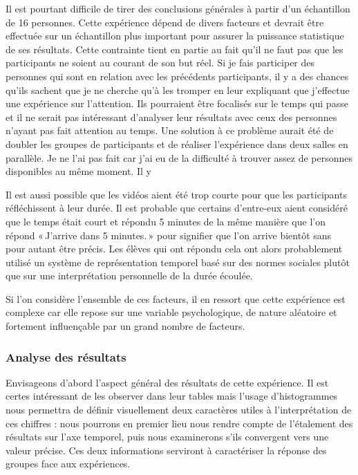 \documentclass[12pt,fleqn,oneside,openany]{book} %
\begin{document}
Il est pourtant difficile de tirer des conclusions générales à partir d'un échantillon de 16 personnes. Cette expérience dépend de divers facteurs et devrait être effectuée sur un échantillon plus important pour assurer la puissance statistique de ses résultats. Cette contrainte tient en partie au fait qu'il ne faut pas que les participants ne soient au courant de son but réel. Si je fais participer des personnes qui sont en relation avec les précédents participants, il y a des chances qu'ils sachent que je ne cherche qu'à les tromper en leur expliquant que j'effectue une expérience sur l'attention. Ils pourraient être focalisés sur le temps qui passe et il ne serait pas intéressant d'analyser leur résultats avec ceux des personnes n'ayant pas fait attention au temps. Une solution à ce problème aurait été de doubler les groupes de participants et de réaliser l'expérience dans deux salles en parallèle. Je ne l'ai pas fait car j'ai eu de la difficulté à trouver assez de personnes disponibles au même moment. Il y 

Il est aussi possible que les vidéos aient été trop courte pour que les participants réfléchissent à leur durée. Il est probable que certains d'entre-eux aient considéré que le temps était court et répondu 5 minutes de la même manière que l'on répond «\,J'arrive dans 5 minutes.\,» pour signifier que l'on arrive bientôt sans pour autant être précis. Les élèves qui ont répondu cela ont alors probablement utilisé un système de représentation temporel basé sur des normes sociales plutôt que sur une interprétation personnelle de la durée écoulée.

Si l'on considère l'ensemble de ces facteurs, il en ressort que cette expérience est complexe car elle repose sur une variable psychologique, de nature aléatoire et fortement influençable par un grand nombre de facteurs.



\subsubsection{Analyse des résultats} \label{sssec:analyseResult1.1}
Envisageons d'abord l'aspect général des résultats de cette expérience. Il est certes intéressant de les observer dans leur tables mais l'usage d'histogrammes nous permettra de définir visuellement deux caractères utiles à l'interprétation de ces chiffres : nous pourrons en premier lieu nous rendre compte de l'étalement des résultats sur l'axe temporel, puis nous examinerons s'ils convergent vers une valeur précise. Ces deux informations serviront à caractériser la réponse des groupes face aux expériences.
\end{document}
